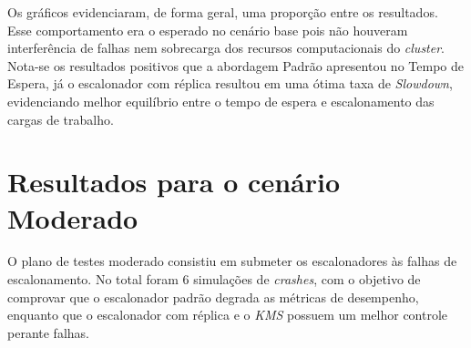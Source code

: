 Os gráficos evidenciaram, de forma geral, uma proporção entre os resultados. Esse comportamento era o esperado no cenário base pois não houveram interferência de falhas nem sobrecarga dos recursos computacionais do \textit{cluster}. Nota-se os resultados positivos que a abordagem Padrão apresentou no Tempo de Espera, já o escalonador com réplica resultou em uma ótima taxa de \textit{Slowdown}, evidenciando melhor equilíbrio entre o tempo de espera e escalonamento das cargas de trabalho.


 \newpage
\section{Resultados para o cenário Moderado}
O plano de testes moderado consistiu em submeter os escalonadores às falhas de escalonamento. No total foram 6 simulações de \textit{crashes}, com o objetivo de comprovar que o escalonador padrão degrada as métricas de desempenho, enquanto que o escalonador com réplica e o \textit{KMS} possuem um melhor controle perante falhas.


